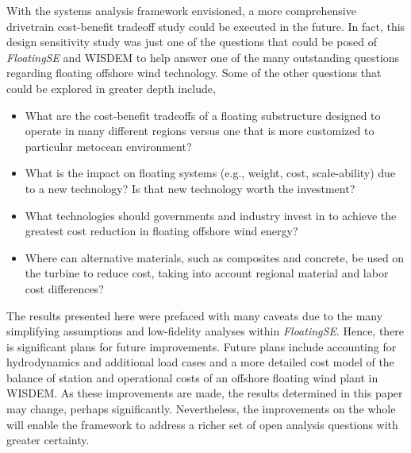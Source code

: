 With the systems analysis framework envisioned, a more comprehensive
drivetrain cost-benefit tradeoff study could be executed in the
future. In fact, this design sensitivity study was just one of the
questions that could be posed of \textit{FloatingSE} and WISDEM to help
answer one of the many outstanding questions regarding floating offshore
wind technology.  Some of the other questions that could be explored in
greater depth include,
\begin{itemize}
\item What are the cost-benefit tradeoffs of a floating substructure
  designed to operate in many different regions versus one that is more
  customized to particular metocean environment?
\item What is the impact on floating systems (e.g., weight, cost,
  scale-ability) due to a new technology?  Is that new
  technology worth the investment?
\item What technologies should governments and industry invest in to
  achieve the greatest cost reduction in floating offshore wind energy?
\item Where can alternative materials, such as composites and concrete,
  be used on the turbine to reduce cost, taking into account regional
  material and labor cost differences?
\end{itemize}

The results presented here were prefaced with many caveats due to the
many simplifying assumptions and low-fidelity analyses within
\textit{FloatingSE}.  Hence, there is significant plans for future
improvements.  Future plans include accounting for hydrodynamics and
additional load cases and a more detailed cost model of the balance of
station and operational costs of an offshore floating wind plant in
WISDEM.  As these improvements are made, the results determined in this
paper may change, perhaps significantly.  Nevertheless, the improvements
on the whole will enable the framework to address a richer set of open
analysis questions with greater certainty.


